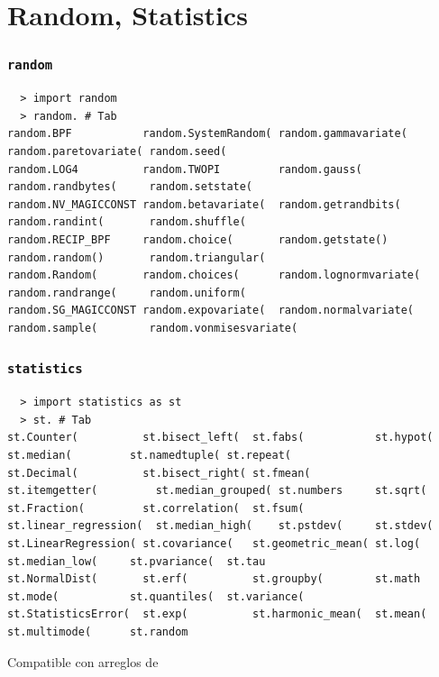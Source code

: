 \documentclass[14pt,aspectratio=169,xcolor=dvipsnames]{beamer}
\begin{document}
\section{Random, Statistics}
\begin{frame}[fragile]\frametitle{\texttt{random}}
    \begin{verbatim}
  > import random
  > random. # Tab
random.BPF           random.SystemRandom( random.gammavariate(   random.paretovariate( random.seed(           
random.LOG4          random.TWOPI         random.gauss(          random.randbytes(     random.setstate(         
random.NV_MAGICCONST random.betavariate(  random.getrandbits(    random.randint(       random.shuffle(          
random.RECIP_BPF     random.choice(       random.getstate()      random.random()       random.triangular(       
random.Random(       random.choices(      random.lognormvariate( random.randrange(     random.uniform(          
random.SG_MAGICCONST random.expovariate(  random.normalvariate(  random.sample(        random.vonmisesvariate( 
    \end{verbatim}
    
\end{frame}
\begin{frame}[fragile]\frametitle{\texttt{statistics}}
    \begin{verbatim}
  > import statistics as st
  > st. # Tab
st.Counter(          st.bisect_left(  st.fabs(           st.hypot(              st.median(         st.namedtuple( st.repeat(
st.Decimal(          st.bisect_right( st.fmean(          st.itemgetter(         st.median_grouped( st.numbers     st.sqrt(
st.Fraction(         st.correlation(  st.fsum(           st.linear_regression(  st.median_high(    st.pstdev(     st.stdev(
st.LinearRegression( st.covariance(   st.geometric_mean( st.log(                st.median_low(     st.pvariance(  st.tau
st.NormalDist(       st.erf(          st.groupby(        st.math                st.mode(           st.quantiles(  st.variance(
st.StatisticsError(  st.exp(          st.harmonic_mean(  st.mean(               st.multimode(      st.random      
    \end{verbatim}
    Compatible con arreglos de  
\end{frame}
\begin{frame}\frametitle{}
\end{frame}
\end{document}
